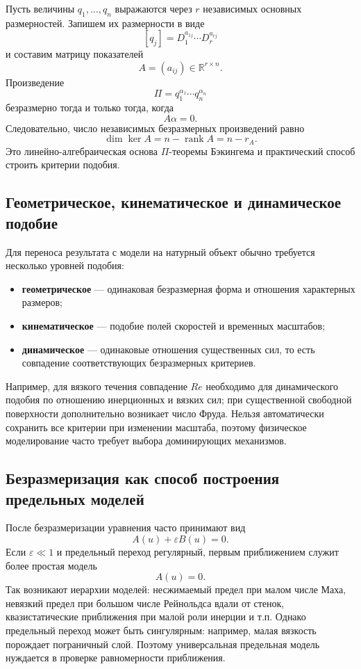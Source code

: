 Пусть величины $q_1,\ldots,q_n$ выражаются через $r$ независимых основных
размерностей. Запишем их размерности в виде
\[
    [q_j]=D_1^{a_{1j}}\cdots D_r^{a_{rj}}
\]
и составим матрицу показателей
\[
    A=(a_{ij})\in\mathbb R^{r\times n}.
\]
Произведение
\[
    \Pi=q_1^{\alpha_1}\cdots q_n^{\alpha_n}
\]
безразмерно тогда и только тогда, когда
\[
    \boxed{A\alpha=0.}
\]
Следовательно, число независимых безразмерных произведений равно
\[
    \dim\ker A=n-\operatorname{rank}A=n-r_A.
\]
Это линейно-алгебраическая основа $\Pi$-теоремы Бэкингема и практический способ
строить критерии подобия.

\subsection{Геометрическое, кинематическое и динамическое подобие}

Для переноса результата с модели на натурный объект обычно требуется несколько
уровней подобия:
\begin{itemize}
    \item \textbf{геометрическое} --- одинаковая безразмерная форма и отношения
    характерных размеров;
    \item \textbf{кинематическое} --- подобие полей скоростей и временных
    масштабов;
    \item \textbf{динамическое} --- одинаковые отношения существенных сил,
    то есть совпадение соответствующих безразмерных критериев.
\end{itemize}
Например, для вязкого течения совпадение $Re$ необходимо для динамического
подобия по отношению инерционных и вязких сил; при существенной свободной
поверхности дополнительно возникает число Фруда. Нельзя автоматически сохранить
все критерии при изменении масштаба, поэтому физическое моделирование часто
требует выбора доминирующих механизмов.

\subsection{Безразмеризация как способ построения предельных моделей}

После безразмеризации уравнения часто принимают вид
\[
    A(u)+\varepsilon B(u)=0.
\]
Если $\varepsilon\ll1$ и предельный переход регулярный, первым приближением
служит более простая модель
\[
    A(u)=0.
\]
Так возникают иерархии моделей: несжимаемый предел при малом числе Маха,
невязкий предел при большом числе Рейнольдса вдали от стенок, квазистатические
приближения при малой роли инерции и т.п. Однако предельный переход может быть
сингулярным: например, малая вязкость порождает пограничный слой. Поэтому
универсальная предельная модель нуждается в проверке равномерности приближения.

